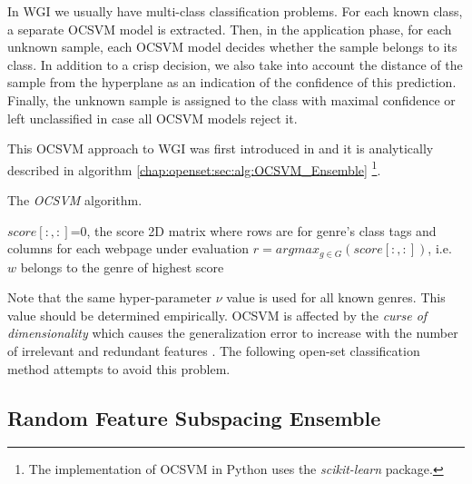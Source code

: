 In WGI we usually have multi-class classification problems. For each known class, a separate OCSVM model is extracted. Then, in the application phase, for each unknown sample, each OCSVM model decides whether the sample belongs to its class. In addition to a crisp decision, we also take into account the distance of the sample from the hyperplane as an indication of the confidence of this prediction. Finally, the unknown sample is assigned to the class with maximal confidence or left unclassified in case all OCSVM models reject it. 

This OCSVM approach to WGI was first introduced in \parencite{pritsos2013open} and it is analytically described in algorithm \ref{chap:openset:sec:alg:OCSVM_Ensemble} \footnote{The implementation of OCSVM in Python uses the \textit{scikit-learn} package.}.

\begin{algorithm}[t]
\caption{The \textit{OCSVM} algorithm.}\label{chap:openset:sec:alg:OCSVM_Ensemble}
$score[:, :]$=0, the score 2D matrix where rows are for genre's class tags and columns for each webpage under evaluation
{
        $r = argmax_{g \in G}(score[:, :])$, i.e. $w$ belongs to the genre of highest score\;
    }
\end{algorithm}

\hfill

Note that the same hyper-parameter $\nu$ value is used for all known genres. This value should be determined empirically. OCSVM is affected by the \textit{curse of dimensionality} which causes the generalization error to increase with the number of irrelevant and redundant features . The following open-set classification method attempts to avoid this problem.

\subsection{Random Feature Subspacing Ensemble}\label{chap:openset:sec:RFSE_Description}

